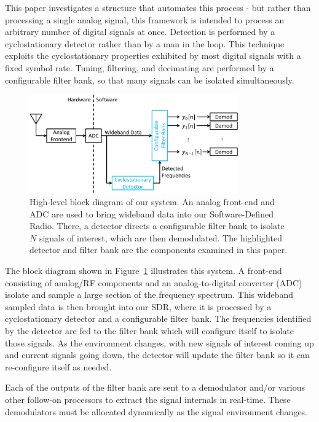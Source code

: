 \documentclass[12pt]{article}
\begin{document}
This paper investigates a structure that automates this process - but rather
than processing a single analog signal, this framework is intended to process
an arbitrary number of digital signals at once. Detection is performed by
a cyclostationary detector rather than by a man in the loop. This technique
exploits the cyclostationary properties exhibited by most digital signals with
a fixed symbol rate.  Tuning, filtering, and decimating are performed by
a configurable filter bank, so that many signals can be isolated
simultaneously.  

\begin{figure}[h!]
    \begin{center}
    \includegraphics[width=0.8\textwidth]{block_diagram}%
    \end{center}
    \caption{High-level block diagram of our system. An analog front-end and
        ADC are used to bring wideband data into our Software-Defined Radio.
        There, a detector directs a configurable filter bank to isolate $N$
        signals of interest, which are then demodulated. The highlighted
        detector and filter bank are the components examined in this paper.}
    \label{fig:block_diagram}
\end{figure}

The block diagram shown in Figure~\ref{fig:block_diagram} illustrates this
system. A front-end consisting of analog/RF components and an analog-to-digital
converter (ADC) isolate and sample a large section of the frequency spectrum.
This wideband sampled data is then brought into our SDR, where it is processed
by a cyclostationary detector and a configurable filter bank. The frequencies identified by
the detector are fed to the filter bank which will configure itself to isolate
those signals. As the environment changes, with new signals of interest coming
up and current signals going down, the detector will update the filter bank so
it can re-configure itself as needed.

Each of the outputs of the filter bank are sent to a demodulator and/or various
other follow-on processors to extract the signal internals in real-time. These
demodulators must be allocated dynamically as the signal environment changes.
\end{document}

